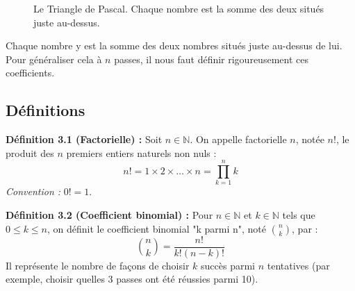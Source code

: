 \begin{figure}[h!]
    \centering
    \caption{Le Triangle de Pascal. Chaque nombre est la somme des deux situés juste au-dessus.}
    \label{fig:triangle_pascal}
\end{figure}

Chaque nombre y est la somme des deux nombres situés juste au-dessus de lui. Pour généraliser cela à $n$ passes, il nous faut définir rigoureusement ces coefficients.

\subsection{Définitions}

\textbf{Définition 3.1 (Factorielle) :} Soit $n \in \mathbb{N}$. On appelle factorielle $n$, notée $n!$, le produit des $n$ premiers entiers naturels non nuls :
$$ n! = 1 \times 2 \times \dots \times n = \prod_{k=1}^n k $$
\textit{Convention :} $0! = 1$.

\textbf{Définition 3.2 (Coefficient binomial) :} Pour $n \in \mathbb{N}$ et $k \in \mathbb{N}$ tels que $0 \le k \le n$, on définit le coefficient binomial "k parmi n", noté $\binom{n}{k}$, par :
$$ \binom{n}{k} = \frac{n!}{k!(n-k)!} $$
Il représente le nombre de façons de choisir $k$ succès parmi $n$ tentatives (par exemple, choisir quelles 3 passes ont été réussies parmi 10).

